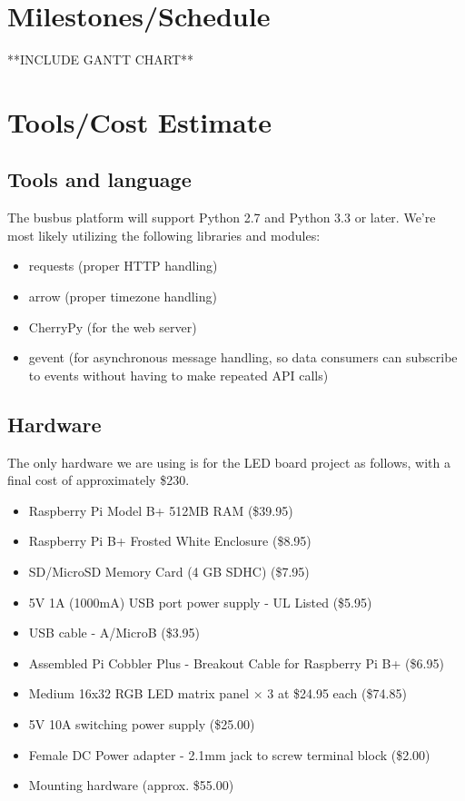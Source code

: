 \documentclass[12pt]{article}
\begin{document}
\section{Milestones/Schedule}
**INCLUDE GANTT CHART**

\section{Tools/Cost Estimate}
\subsection{Tools and language}
The busbus platform will support Python 2.7 and Python 3.3 or later. We're most likely utilizing the following
libraries and modules:
\begin{itemize}
\item requests (proper HTTP handling)
\item arrow (proper timezone handling)
\item CherryPy (for the web server)
\item gevent (for asynchronous message handling, so data consumers can subscribe to events
without having to make repeated API calls)
\end{itemize}

\subsection{Hardware}
The only hardware we are using is for the LED board project as follows, with a final cost of approximately \$230.
\begin{itemize}
\item Raspberry Pi Model B+ 512MB RAM (\$39.95)
\item Raspberry Pi B+ Frosted White Enclosure (\$8.95)
\item SD/MicroSD Memory Card (4 GB SDHC) (\$7.95)
\item 5V 1A (1000mA) USB port power supply - UL Listed (\$5.95)
\item USB cable - A/MicroB (\$3.95)
\item Assembled Pi Cobbler Plus - Breakout Cable for Raspberry Pi B+ (\$6.95)
\item Medium 16x32 RGB LED matrix panel × 3 at \$24.95 each (\$74.85)
\item 5V 10A switching power supply (\$25.00)
\item Female DC Power adapter - 2.1mm jack to screw terminal block (\$2.00)
\item Mounting hardware (approx. \$55.00)
\end{itemize}
\end{document}
